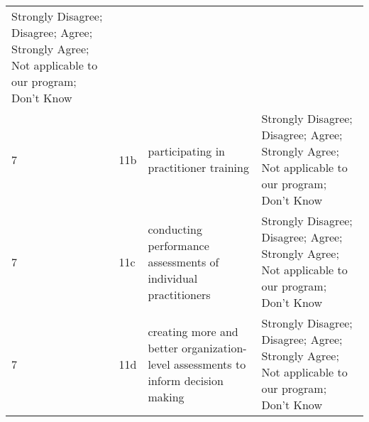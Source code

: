 \documentclass[]{article}
\begin{document}
\begin{longtable}[]{@{}llll@{}}
\begin{minipage}[t]{0.39\columnwidth}
Strongly Disagree; Disagree; Agree; Strongly Agree; Not applicable to
our program; Don't Know\strut
\end{minipage}\tabularnewline
\begin{minipage}[t]{0.05\columnwidth}\raggedright\strut
7\strut
\end{minipage} & \begin{minipage}[t]{0.04\columnwidth}\raggedright\strut
11b\strut
\end{minipage} & \begin{minipage}[t]{0.41\columnwidth}\raggedright\strut
participating in practitioner training\strut
\end{minipage} & \begin{minipage}[t]{0.39\columnwidth}\raggedright\strut
Strongly Disagree; Disagree; Agree; Strongly Agree; Not applicable to
our program; Don't Know\strut
\end{minipage}\tabularnewline
\begin{minipage}[t]{0.05\columnwidth}\raggedright\strut
7\strut
\end{minipage} & \begin{minipage}[t]{0.04\columnwidth}\raggedright\strut
11c\strut
\end{minipage} & \begin{minipage}[t]{0.41\columnwidth}\raggedright\strut
conducting performance assessments of individual practitioners\strut
\end{minipage} & \begin{minipage}[t]{0.39\columnwidth}\raggedright\strut
Strongly Disagree; Disagree; Agree; Strongly Agree; Not applicable to
our program; Don't Know\strut
\end{minipage}\tabularnewline
\begin{minipage}[t]{0.05\columnwidth}\raggedright\strut
7\strut
\end{minipage} & \begin{minipage}[t]{0.04\columnwidth}\raggedright\strut
11d\strut
\end{minipage} & \begin{minipage}[t]{0.41\columnwidth}\raggedright\strut
creating more and better organization-level assessments to inform
decision making\strut
\end{minipage} & \begin{minipage}[t]{0.39\columnwidth}\raggedright\strut
Strongly Disagree; Disagree; Agree; Strongly Agree; Not applicable to
our program; Don't Know\strut
\end{minipage}\tabularnewline
\bottomrule
\end{longtable}
\end{document}
